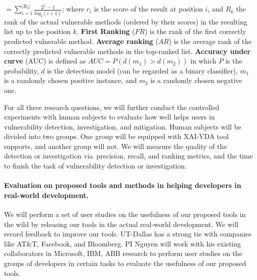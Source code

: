 $=\sum_{i=1}^{|R_k|}\frac{2^{r_i}-1}{log_2(i+1)}$; where $r_i$ is the
score of the result at position $i$, and $R_k$ the rank of the actual
vulnerable methods (ordered by their scores) in the resulting list up
to the position $k$.
%
{\bf First Ranking} ($FR$) is the rank of the first correctly
predicted vulnerable method. {\bf Average ranking} ($AR$) is the
average rank of the correctly predicted vulnerable
methods in the top-ranked list.
%
{\bf Accuracy under curve} (AUC) is defined as $AUC = P(d(m_1)>d(m_2))$ in
which $P$ is the probability, $d$ is the detection model (can be
regarded as a binary classifier), $m_1$ is a randomly chosen positive
instance, and $m_2$ is a randomly chosen negative one.

For all three research questions, we will further conduct the controlled experiments with human subjects to evaluate how well {\tool} helps users in vulnerability detection, investigation, and mitigation. Human subjects will be divided into two groups. One group will be equipped with XAI-VDA tool supports, and another group will not. We will measure the quality of the detection or investigation via~precision, recall, and ranking metrics, and the time to finish the task of vulnerability detection or investigation.







\paragraph{\bf Evaluation on proposed tools and methods in helping developers in real-world development.}

We will perform a set of user studies on the usefulness of our
proposed tools in the wild by releasing our
tools in the actual real-world development. 
We will record feedback to improve our tools.
UT-Dallas has a strong tie with companies like AT\&T, Facebook, and
Bloomberg. PI Nguyen will work with his existing collaborators in
Microsoft, IBM, ABB research to perform user studies on the groups of
developers in certain tasks to evaluate the usefulness of our proposed
tools.
